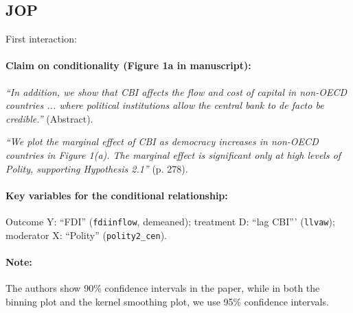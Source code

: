\documentclass[12pt]{article}
\begin{document}
\subsection{\citet{Bodea2015_JOP} JOP} \label{bodea_JOP}

First interaction:

\paragraph{Claim on conditionality  (Figure 1a in manuscript):}  \emph{``In addition, we show that CBI affects the flow and cost of capital in non-OECD countries ... where political institutions allow
  the central bank to de facto be credible.''} (Abstract).

\emph{``We plot the marginal effect of CBI as democracy increases in
  non-OECD countries in Figure 1(a). The marginal effect is
  significant only at high levels of Polity, supporting Hypothesis
  2.1''} (p. 278). 

\paragraph{Key variables for the conditional relationship:} Outcome Y:
``FDI'' (\texttt{fdiinflow}, demeaned); treatment D: ``lag CBI''' (\texttt{llvaw}); moderator X: ``Polity'' (\texttt{polity2\_cen}). 

\paragraph{Note:} The authors show 90\% confidence intervals in the paper, while in both the binning plot and the kernel smoothing plot, we use 95\% confidence intervals.

\clearpage
\end{document}
